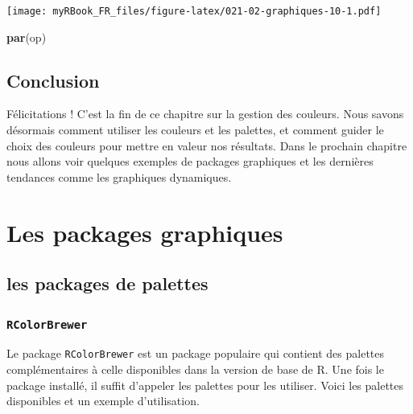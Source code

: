 \documentclass[
]{book}
\newenvironment{Shaded}{\begin{snugshade}}{\end{snugshade}}
\newcommand{\KeywordTok}[1]{\textcolor[rgb]{0.13,0.29,0.53}{\textbf{#1}}}
\newcommand{\NormalTok}[1]{#1}
\begin{document}
\texttt{[image: myRBook\_FR\_files/figure-latex/021-02-graphiques-10-1.pdf]}

\begin{Shaded}
\begin{Highlighting}[]
\KeywordTok{par}\NormalTok{(op)}
\end{Highlighting}
\end{Shaded}

\hypertarget{conclusion-9}{%
\section{Conclusion}\label{conclusion-9}}

Félicitations ! C'est la fin de ce chapitre sur la gestion des couleurs. Nous savons désormais comment utiliser les couleurs et les palettes, et comment guider le choix des couleurs pour mettre en valeur nos résultats. Dans le prochain chapitre nous allons voir quelques exemples de packages graphiques et les dernières tendances comme les graphiques dynamiques.

\hypertarget{graph3}{%
\chapter{Les packages graphiques}\label{graph3}}

\hypertarget{les-packages-de-palettes}{%
\section{les packages de palettes}\label{les-packages-de-palettes}}

\hypertarget{rcolorbrewer}{%
\subsection{\texorpdfstring{\texttt{RColorBrewer}}{RColorBrewer}}\label{rcolorbrewer}}

Le package \texttt{RColorBrewer} est un package populaire qui contient des palettes complémentaires à celle disponibles dans la version de base de R. Une fois le package installé, il suffit d'appeler les palettes pour les utiliser. Voici les palettes disponibles et un exemple d'utilisation.
\end{document}
